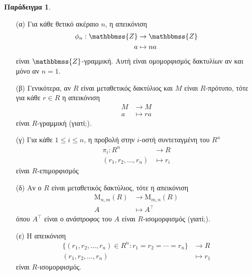 \documentclass[12pt,a4paper,reqno]{amsart}
\theoremstyle{definition}
\newtheorem{example}[theorem]{Παράδειγμα}
\theoremstyle{remark}
\numberwithin{theorem}{section}
\numberwithin{exercise}{section}
\numberwithin{equation}{section}
\newcommand{\ZZ}{\mathbbmss{Z}}
\newcommand{\rmM}{\mathrm{M}}
\renewcommand{\to}{\rightarrow}
\begin{document}
\begin{example}
    \label{ex:module_homomorphism}
    \leavevmode
    \begin{itemize}
        \item[(α)] Για κάθε θετικό ακέραιο $n$, η απεικόνιση 
        \begin{align*}
            \phi_n : \ZZ &\to \ZZ \\ 
            a &\mapsto na 
        \end{align*}
        είναι $\ZZ$-γραμμική. Αυτή είναι ομομορφισμός δακτυλίων αν και μόνο αν $n=1$.
        \item[(β)] Γενικότερα, αν $R$ είναι μεταθετικός δακτύλιος και $M$ είναι $R$-πρότυπο, τότε για κάθε $r \in R$ η απεικόνιση 
        \begin{align*}
            M &\to M \\ 
            a &\mapsto ra 
        \end{align*}
        είναι $R$-γραμμική (γιατί;).
        \item[(γ)] Για κάθε $1 \le i \le n$, η προβολή στην $i$-οστή συντεταγμένη του $R^n$ 
        \begin{align*}
            \pi_i : R^n &\to R \\ 
            (r_1, r_2, \dots, r_n) &\mapsto r_i
        \end{align*}
        είναι $R$-επιμορφισμός
        \item[(δ)] Αν ο $R$ είναι μεταθετικός δακτύλιος, τότε η απεικόνιση 
        \begin{align*}
             \rmM_{n,m}(R) &\to \rmM_{m,n}(R) \\ 
            A &\mapsto A^\top
        \end{align*}
        όπου $A^\top$ είναι ο \emph{ανάστροφος} του $A$ είναι $R$-ισομορφισμός (γιατί;).
        \item[(ε)] Η απεικόνιση 
        \begin{align*}
            \{(r_1, r_2, \dots, r_n) \in R^n : r_1 = r_2 = \cdots = r_n\} &\to R \\ 
            (r_1, r_2, \dots, r_n) &\mapsto r_1
        \end{align*}
        είναι $R$-ισομορφισμός.
    \end{itemize}
\end{example}
\end{document}
